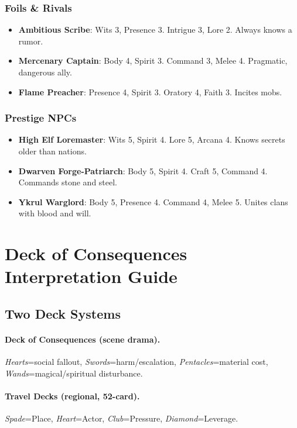 \subsubsection*{Foils \& Rivals}

\begin{itemize}
    \item \textbf{Ambitious Scribe}: Wits 3, Presence 3. Intrigue 3, Lore 2. Always knows a rumor.
    \item \textbf{Mercenary Captain}: Body 4, Spirit 3. Command 3, Melee 4. Pragmatic, dangerous ally.
    \item \textbf{Flame Preacher}: Presence 4, Spirit 3. Oratory 4, Faith 3. Incites mobs.
\end{itemize}

\subsubsection*{Prestige NPCs}

\begin{itemize}
    \item \textbf{High Elf Loremaster}: Wits 5, Spirit 4. Lore 5, Arcana 4. Knows secrets older than nations.
    \item \textbf{Dwarven Forge-Patriarch}: Body 5, Spirit 4. Craft 5, Command 4. Commands stone and steel.
    \item \textbf{Ykrul Warglord}: Body 5, Presence 4. Command 4, Melee 5. Unites clans with blood and will.
\end{itemize}

\section*{Deck of Consequences Interpretation Guide}

\subsection*{Two Deck Systems}

\paragraph{Deck of Consequences (scene drama).}
\emph{Hearts}=social fallout, \emph{Swords}=harm/escalation, \emph{Pentacles}=material cost, \emph{Wands}=magical/spiritual disturbance.

\paragraph{Travel Decks (regional, 52-card).}
\emph{Spade}=Place, \emph{Heart}=Actor, \emph{Club}=Pressure, \emph{Diamond}=Leverage.


